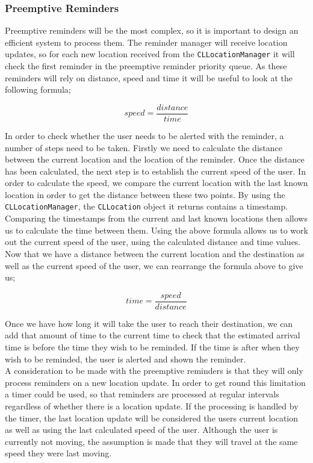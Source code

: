 \documentclass[12pt]{report}
\begin{document}
\subsubsection{Preemptive Reminders}

Preemptive reminders will be the most complex, so it is important to design an efficient system to process them. The reminder manager will receive location updates, so for each new location received from the \texttt{CLLocationManager} it will check the first reminder in the preemptive reminder priority queue. As these reminders will rely on distance, speed and time it will be useful to look at the following formula;

\begin{equation}
speed = \frac{distance}{time}
\end{equation}


In order to check whether the user needs to be alerted with the reminder, a number of steps need to be taken. Firstly we need to calculate the distance between the current location and the location of the reminder. Once the distance has been calculated, the next step is to establish the current speed of the user. In order to calculate the speed, we compare the current location with the last known location in order to get the distance between these two points. By using the \texttt{CLLocationManager}, the \texttt{CLLocation} object it returns contains a timestamp. Comparing the timestamps from the current and last known locations then allows us to calculate the time between them. Using the above formula allows us to work out the current speed of the user, using the calculated distance and time values. Now that we have a distance between the current location and the destination as well as the current speed of the user, we can rearrange the formula above to give us;

\begin{equation}
time = \frac{speed}{distance}
\end{equation}

Once we have how long it will take the user to reach their destination, we can add that amount of time to the current time to check that the estimated arrival time is before the time they wish to be reminded. If the time is after when they wish to be reminded, the user is alerted and shown the reminder.\\

A consideration to be made with the preemptive reminders is that they will only process reminders on a new location update. In order to get round this limitation a timer could be used, so that reminders are processed at regular intervals regardless of whether there is a location update. If the processing is handled by the timer, the last location update will be considered the users current location as well as using the last calculated speed of the user. Although the user is currently not moving, the assumption is made that they will travel at the same speed they were last moving.
\end{document}
